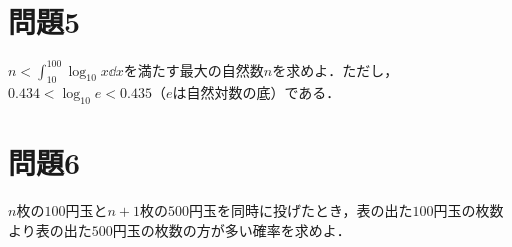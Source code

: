 \documentclass[unicode,12pt, A4j]{ltjsarticle}%
\begin{document}
\section{問題5}
$n<\int_{10}^{100}\log_{10} x \dd x$を満たす最大の自然数$n$を求めよ．ただし，$0.434<\log_{10} e< 0.435$（$e$は自然対数の底）である．

\section{問題6}
$n$枚の$100$円玉と$n+1$枚の$500$円玉を同時に投げたとき，表の出た$100$円玉の枚数より表の出た$500$円玉の枚数の方が多い確率を求めよ．
\end{document}
